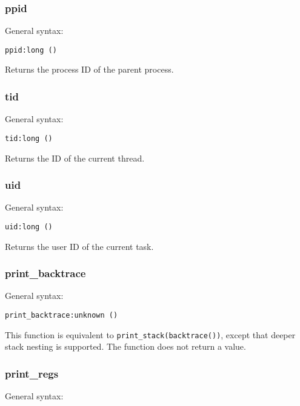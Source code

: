\documentclass[twoside,english]{article}
\newenvironment{vindent}
{\begin{list}{}{\setlength{\listparindent}{6pt}}
\item[]}
{\end{list}}
\begin{document}
\subsubsection{ppid}
General syntax:

\begin{vindent}
\begin{verbatim}
ppid:long ()
\end{verbatim}
\end{vindent}
Returns the process ID of the parent process.


\subsubsection{tid}
General syntax:

\begin{vindent}
\begin{verbatim}
tid:long ()
\end{verbatim}
\end{vindent}
Returns the ID of the current thread.


\subsubsection{uid}
General syntax:

\begin{vindent}
\begin{verbatim}
uid:long ()
\end{verbatim}
\end{vindent}
Returns the user ID of the current task.


\subsubsection{print\_backtrace}
General syntax:

\begin{vindent}
\begin{verbatim}
print_backtrace:unknown ()
\end{verbatim}
\end{vindent}
This function is equivalent to \texttt{print\_stack(backtrace())}, except
that deeper stack nesting is supported. The function does not return a value.


\subsubsection{print\_regs}
General syntax:
\end{document}
